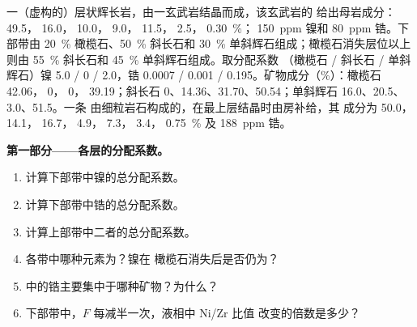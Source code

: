 \begin{problem}
\label{pb:b2:magmatic-differentiation:1}
一（虚构的）层状辉长岩，由一玄武岩结晶而成，该玄武岩的
给出母岩成分： 49.5， 16.0， 10.0，
 9.0， 11.5， 2.5， \qty{0.30}{\percent}；
\qty{150}{ppm} 镍和 \qty{80}{ppm} 锆。下部带由
\qty{20}{\percent} 橄榄石、\qty{50}{\percent} 斜长石和 \qty{30}{\percent}
单斜辉石组成；橄榄石消失层位以上则由 \qty{55}{\percent}
斜长石和 \qty{45}{\percent} 单斜辉石组成。取分配系数
（橄榄石 / 斜长石 / 单斜辉石）镍 5.0 / 0 / 2.0，锆 0.0007 / 0.001 /
0.195。矿物成分（\unit{\percent}）：橄榄石  42.06， 0，
 0， 39.19；斜长石 0、14.36、31.70、50.54；单斜辉石
16.0、20.5、3.0、51.5。一条
由细粒岩石构成的，在最上层结晶时由房补给，其
成分为  50.0， 14.1， 16.7， 4.9， 7.3，
 3.4， \qty{0.75}{\percent} 及 \qty{188}{ppm} 锆。

\noindent\textbf{第一部分——各层的分配系数。}
\begin{enumerate}
\item 计算下部带中镍的总分配系数。
\item 计算下部带中锆的总分配系数。
\item 计算上部带中二者的总分配系数。
\item 各带中哪种元素为？镍在
橄榄石消失后是否仍为？
\item {}中的锆主要集中于哪种矿物？为什么？
\item 下部带中，$F$ 每减半一次，液相中 Ni/Zr 比值
改变的倍数是多少？
\end{enumerate}


\end{problem}
